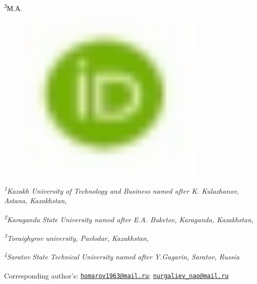 \textsuperscript{3}М.А.
\begin{figure}[H]
	\centering
	\includegraphics[width=0.8\textwidth]{media/chem2/image16}
	\caption*{}
\end{figure}


\emph{\textsuperscript{1}Kazakh University of Technology and Business
named after K. Kulazhanov, Astana, Kazakhstan,}

\emph{\textsuperscript{2}Karaganda State University named after E.A.
Buketov, Karaganda, Kazakhstan,}

\emph{\textsuperscript{3}Toraighyrov university, Pavlodar, Kazakhstan,}

\emph{\textsuperscript{4}Saratov State Technical University named after
Y.Gagarin, Saratov, Russia}

{\bfseries \textsuperscript{\envelope }}Corresponding author's:
\href{mailto:homarov1963@mail.ru}{\nolinkurl{homarov1963@mail.ru}};
\href{mailto:nurgaliev_nao@mail.ru}{\nolinkurl{nurgaliev\_nao@mail.ru}}

